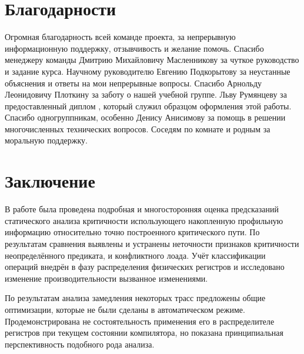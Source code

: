 \documentclass[a4paper,12pt,titlepage]{article}
\begin{document}
\section{Благодарности}
Огромная благодарность всей команде проекта, за непрерывную информационную поддержку, отзывчивость и желание помочь. Спасибо менеджеру команды Дмитрию Михайловичу Масленникову за чуткое руководство и задание курса. Научному руководителю Евгению Подкорытову за неустанные объяснения и ответы на мои непрерывные вопросы. Спасибо Арнольду Леонидовичу Плоткину за заботу о нашей учебной группе. Льву Румянцеву за предоставленный диплом \cite{lev}, который служил образцом оформления этой работы. Спасибо одногруппникам, особенно Денису Анисимову за помощь в решении многочисленных технических вопросов. Соседям по комнате и родным за моральную поддержку.

\newpage
\section{Заключение}
В работе была проведена подробная и многосторонняя оценка предсказаний статического анализа критичности использующего накопленную профильную информацию относительно точно построенного критического пути. По результатам сравнения выявлены и устранены неточности признаков критичности неопределённого предиката, и конфликтного лоада. Учёт классификации операций внедрён в фазу распределения физических регистров и исследовано изменение производительности вызванное изменениями.

 По результатам анализа замедления некоторых трасс предложены общие оптимизации, которые не были сделаны в автоматическом режиме. Продемонстрирована не состоятельность применения его в распределителе регистров при текущем состоянии компилятора, но показана принципиальная перспективность подобного рода анализа.

\newpage


\listoffigures

\end{document}
